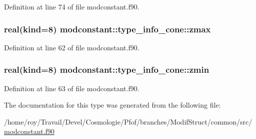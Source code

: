 Definition at line 74 of file modconstant.\-f90.

\hypertarget{structmodconstant_1_1type__info__cone_a4e84222292eb0fb51c32d83fbc8cc067}{
\subsubsection[{zmax}]{\setlength{\rightskip}{0pt plus 5cm}real(kind=8) modconstant\-::type\-\_\-info\-\_\-cone\-::zmax}}\label{structmodconstant_1_1type__info__cone_a4e84222292eb0fb51c32d83fbc8cc067}


Definition at line 62 of file modconstant.\-f90.

\hypertarget{structmodconstant_1_1type__info__cone_a693a03e546d6b8b22afe1d25f7ed188e}{
\subsubsection[{zmin}]{\setlength{\rightskip}{0pt plus 5cm}real(kind=8) modconstant\-::type\-\_\-info\-\_\-cone\-::zmin}}\label{structmodconstant_1_1type__info__cone_a693a03e546d6b8b22afe1d25f7ed188e}


Definition at line 63 of file modconstant.\-f90.



The documentation for this type was generated from the following file\-:\begin{DoxyCompactItemize}
\item 
/home/roy/\-Travail/\-Devel/\-Cosmologie/\-Pfof/branches/\-Modif\-Struct/common/src/\hyperlink{modconstant_8f90}{modconstant.\-f90}\end{DoxyCompactItemize}
